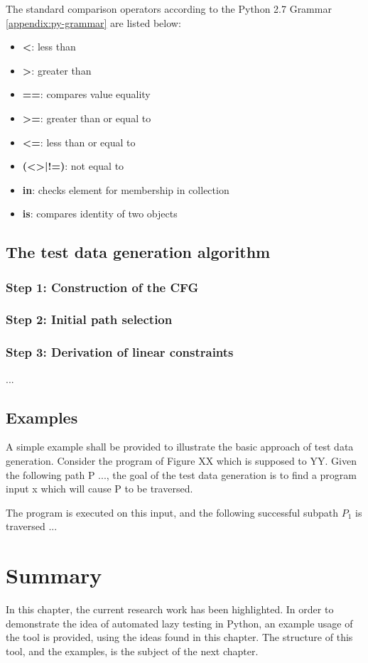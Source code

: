 \documentclass{icldt}
\numberwithin{equation}{section}       %
\begin{document}
{The standard comparison operators according to the Python 2.7 Grammar \ref{appendix:py-grammar} are listed below:
\begin{itemize}
	\item \textbf{<}: less than
	\item \textbf{>}: greater than
	\item \textbf{==}: compares value equality
	\item \textbf{>=}: greater than or equal to
	\item \textbf{<=}: less than or equal to
	\item \textbf{(<>|!=)}: not equal to
	\item \textbf{in}: checks element for membership in collection
	\item \textbf{is}: compares identity of two objects
\end{itemize}

\subsection{The test data generation algorithm}
	\subsubsection{Step 1: Construction of the CFG}
	\subsubsection{Step 2: Initial path selection}
	\subsubsection{Step 3: Derivation of linear constraints}
	...

\subsection{Examples}
A simple example shall be provided to illustrate the basic approach of test data generation. Consider the program of Figure XX which is supposed to YY.
Given the following path P ..., the goal of the test data generation is to find a program input x which will cause P to be traversed.

The program is executed on this input, and the following successful subpath $P_1$ is traversed ...

\section{Summary}
In this chapter, the current research work has been highlighted. In order to demonstrate the idea of automated lazy testing in Python, an example usage of the tool is provided, using the ideas found in this chapter. The structure of this tool, and the examples, is the subject of the next chapter.
}
\end{document}
